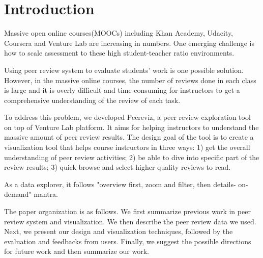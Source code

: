 \documentclass{sigchi}
\begin{document}


\section{Introduction}
Massive open online courses(MOOCs) including Khan Academy, Udacity, Coursera and
Venture Lab are increasing in numbers. \cite{nytimes} One emerging challenge is
how to scale assessment to these high student-teacher ratio environments.

Using peer review system \cite{cpr} to evaluate students’ work is one possible solution.
However, in the massive online courses,
the number of reviews done in each class is large and it is overly difficult
and time-consuming for instructors to get a comprehensive understanding
of the review of each task.

To address this problem, we developed Peereviz, a peer review exploration tool
on top of Venture Lab platform. It aims for helping instructors to understand
the massive amount of peer review results. The design goal of the tool is to
create a visualization tool that helps course instructors in three ways:
1) get the overall understanding of peer review activities;
2) be able to dive into specific part of the review results;
3) quick browse and select higher quality reviews to read.

As a data explorer, it follows "overview first, zoom and filter, then details-
on-demand" mantra. \cite{card1999readings}


The paper organization is as follows.
We first summarize previous work in peer review system and visualization.
We then describe the peer review data we used.
Next, we present our design and visualization techniques,
followed by the evaluation and feedbacks from users.
Finally, we suggest the possible directions for future work
and then summarize our work.
\end{document}
